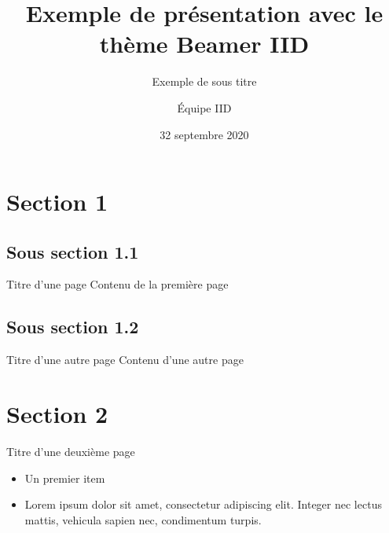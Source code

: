 \documentclass[aspectratio=169]{beamer}
\title{Exemple de présentation avec le thème Beamer IID}
\subtitle{Exemple de sous titre}
\author{Équipe IID}
\date{32 septembre 2020}
\begin{document}
\begin{frame}[plain]
    \maketitle
\end{frame}

\section{Section 1}
\subsection{Sous section 1.1}
\begin{frame}{Titre d'une page}
Contenu de la première page
\end{frame}
\subsection{Sous section 1.2}
\begin{frame}{Titre d'une autre page}
Contenu d'une autre page
\end{frame}
\section{Section 2}

\begin{frame}{Titre d'une deuxième page}
\begin{itemize}
	\item Un premier item
	\item Lorem ipsum dolor sit amet, consectetur adipiscing elit. Integer nec lectus mattis, vehicula sapien nec, condimentum turpis.
\end{itemize}
\end{frame}

\begin{frame}[plain]
	\makethanks
\end{frame}
\end{document}
